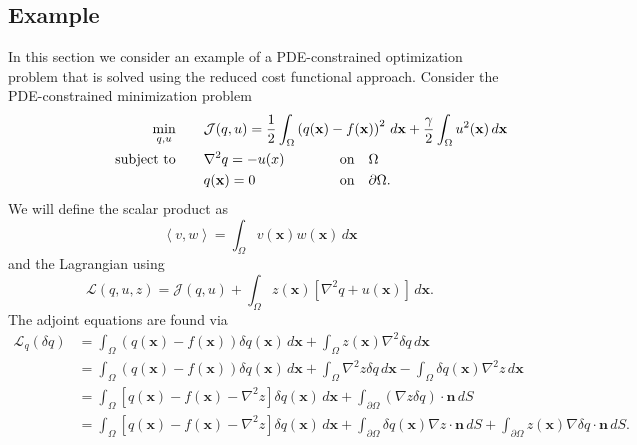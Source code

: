 \subsection{Example}
\label{sec:methods-pdeopt-example}
In this section we consider an example of a PDE-constrained optimization problem that is solved using the reduced cost functional approach. Consider the PDE-constrained minimization problem
\begin{align}
\label{eq:example1}
\underset{q,u}{\textrm{min}} &\qquad \mathcal{J}(q,u) = \frac{1}{2}\int_\Omega \left( q(\mathbf{x}) - f(\mathbf{x})\right)^2 \, d\mathbf{x} + \frac{\gamma}{2} \int_\Omega u^2(\mathbf{x}) \, d\mathbf{x} \\
\label{eq:example2}
\text{subject to} &\qquad \nabla^2 q = -u(x)& \qquad & \hspace{-15em} \text{on} \quad \Omega\\
\label{eq:example3}
&\qquad q(\mathbf{x}) = 0 & \qquad & \hspace{-15em} \text{on} \quad \partial \Omega.
\end{align}
We will define the scalar product as 
\begin{equation}
\left \langle v, w \right \rangle = \int_\Omega v(\mathbf{x}) w(\mathbf{x}) \, d \mathbf{x}
\end{equation}
and the Lagrangian using
\begin{equation}
\mathcal{L}(q, u, z) = \mathcal{J}(q,u) + \int_\Omega z(\mathbf{x}) \left[ \nabla^2 q + u(\mathbf{x}) \right] \, d\mathbf{x}.
\end{equation}
The adjoint equations are found via
\begin{align}
\mathcal{L}_q(\delta q) &= \int_\Omega \left( q(\mathbf{x}) - f(\mathbf{x})\right) \delta q(\mathbf{x}) \, d\mathbf{x} +\int_\Omega z(\mathbf{x}) \nabla^2 \delta q \, d\mathbf{x} \nonumber \\
&= \int_\Omega \left( q(\mathbf{x}) - f(\mathbf{x})\right) \delta q(\mathbf{x}) \, d\mathbf{x} +\int_\Omega \nabla^2 z \delta q \, d\mathbf{x} - \int_\Omega  \delta q(\mathbf{x}) \nabla^2 z \, d\mathbf{x} \\
&= \int_\Omega \left[ q(\mathbf{x}) - f(\mathbf{x})- \nabla^2 z\right] \delta q(\mathbf{x}) \, d\mathbf{x} +\int_{\partial \Omega} \left( \nabla z \delta q\right) \cdot \mathbf{n} \, dS \nonumber \\
&= \int_\Omega \left[ q(\mathbf{x}) - f(\mathbf{x})- \nabla^2 z\right] \delta q(\mathbf{x}) \, d\mathbf{x} +\int_{\partial \Omega} \delta q(\mathbf{x}) \nabla z  \cdot \mathbf{n} \, dS +\int_{\partial \Omega} z(\mathbf{x}) \nabla \delta q  \cdot \mathbf{n} \, dS. \nonumber
\end{align}
